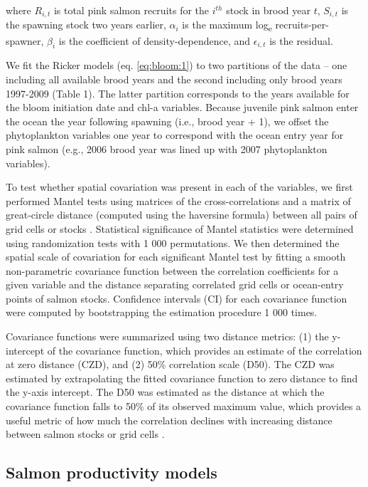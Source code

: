 \noindent
where \(R_{i,t}\) is total pink salmon recruits for the \(i^{th}\) stock in
brood year \(t\), \(S_{i,t}\) is the spawning stock two years earlier,
\(\alpha_i\) is the maximum log\textsubscript{e} recruits-per-spawner,
\(\beta_i\) is the coefficient of density-dependence, and \(\epsilon_{i,t}\) is
the residual.

We fit the Ricker models (eq. \ref{eq:bloom:1}) to two partitions of the data -- one
including all available brood years and the second including only brood years
1997-2009 (Table 1). The latter partition corresponds to the years available for
the bloom initiation date and chl-a variables. Because juvenile pink salmon
enter the ocean the year following spawning (i.e., brood year + 1), we offset
the phytoplankton variables one year to correspond with the ocean entry year for
pink salmon (e.g., 2006 brood year was lined up with 2007 phytoplankton
variables).

To test whether spatial covariation was present in each of the variables, we
first performed Mantel tests using matrices of the cross-correlations and a
matrix of great-circle distance (computed using the haversine formula) between
all pairs of grid cells or stocks \citep{Legendre1998a, Koenig1999a}.
Statistical significance of Mantel statistics were determined using
randomization tests with 1 000 permutations. We then determined the spatial
scale of covariation for each significant Mantel test by fitting a smooth
non-parametric covariance function \citep{Bjornstad2001a} between the
correlation coefficients for a given variable and the distance separating
correlated grid cells or ocean-entry points of salmon stocks. Confidence
intervals (CI) for each covariance function were computed by bootstrapping the
estimation procedure 1 000 times.

Covariance functions were summarized using two distance metrics: (1) the
y-intercept of the covariance function, which provides an estimate of the
correlation at zero distance (CZD), and (2) 50\% correlation scale (D50). The
CZD was estimated by extrapolating the fitted covariance function to zero
distance to find the y-axis intercept. The D50 was estimated as the distance at
which the covariance function falls to 50\% of its observed maximum value, which
provides a useful metric of how much the correlation declines with increasing
distance between salmon stocks or grid cells \citep{Mueter2002b}.

\subsection{Salmon productivity models}

